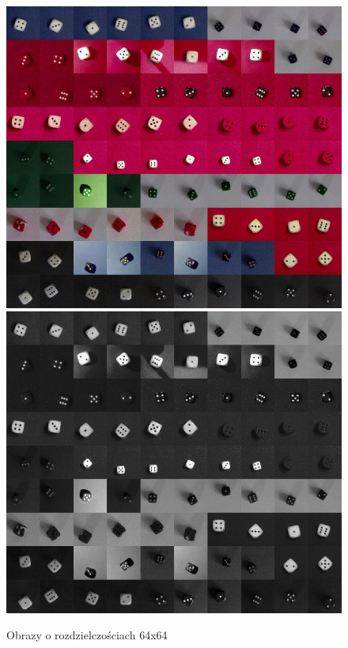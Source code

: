 \begin{figure}[h!]
\centering
\includegraphics[scale=0.35]{images/kolaz}
\includegraphics[scale=0.35]{images/kolaz_grayscale}
\caption{Obrazy o rozdzielczościach 64x64}
\label{fig:squares}
\end{figure}


